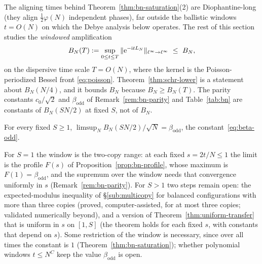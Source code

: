 The aligning times behind Theorem~\ref{thm:bn-saturation}(2) are Diophantine-long (they align
$\tfrac12\varphi(N)$ independent phases), far outside the ballistic windows $t=O(N)$ on which the Debye analysis
below operates. The rest of this section studies the \emph{windowed} amplification
\[
  B_N(T):=\sup_{0\le t\le T}\|\mathrm{e}^{-\mathrm itL_N}\|_{\ell^\infty\to\ell^\infty}\ \le\ B_N ,
\]
on the dispersive time scale $T=O(N)$, where the kernel is the Poisson-periodized Bessel front
\eqref{eq:poisson}.
Theorem~\ref{thm:schr-lower} is a statement about $B_N(N/4)$, and it bounds $B_N$ because $B_N\ge B_N(T)$.
The parity constants $c_0/\sqrt2$ and $\beta_{\mathrm{odd}}$ of Remark~\ref{rem:bn-parity} and
Table~\ref{tab:bn} are constants of $B_N(SN/2)$ at fixed $S$, not of $B_N$.

\begin{conjecture}\label{conj:bn-window}
For every fixed $S\ge1$, $\limsup_N B_N(SN/2)/\sqrt N=\beta_{\mathrm{odd}}$, the constant~\eqref{eq:beta-odd}.
\end{conjecture}

\noindent For $S=1$ the window is the two-copy range: at each fixed $s=2t/N\le1$ the limit is the profile
$F(s)$ of Proposition~\ref{prop:bn-profile}, whose maximum is $F(1)=\beta_{\mathrm{odd}}$, and the supremum over
the window needs that convergence uniformly in $s$ (Remark~\ref{rem:bn-parity}). For $S>1$ two steps remain open: the
expected-modulus inequality of \S\ref{sub:multicopy} for balanced configurations with more than three copies
(proved, computer-assisted, for at most three copies; validated numerically beyond), and a
version of Theorem~\ref{thm:uniform-transfer} that is uniform in $s$ on $[1,S]$ (the theorem holds for each fixed
$s$, with constants that depend on $s$). Some restriction of the window is necessary, since over all times the
constant is $1$ (Theorem~\ref{thm:bn-saturation}); whether polynomial windows $t\le N^C$ keep the value
$\beta_{\mathrm{odd}}$ is open.

